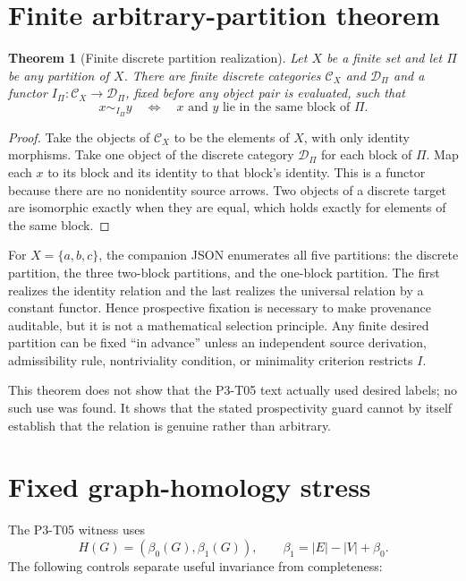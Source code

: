 \documentclass[11pt]{article}
\newtheorem{theorem}{Theorem}
\begin{document}
\section{Finite arbitrary-partition theorem}

\begin{theorem}[Finite discrete partition realization]
Let \(X\) be a finite set and let \(\Pi\) be any partition of \(X\).  There
are finite discrete categories \(\mathcal C_X\) and \(\mathcal D_\Pi\) and a
functor \(I_\Pi:\mathcal C_X\to\mathcal D_\Pi\), fixed before any object
pair is evaluated, such that
\[
 x\sim_{I_\Pi}y \quad\Longleftrightarrow\quad
 x\text{ and }y\text{ lie in the same block of }\Pi.
\]
\end{theorem}
\begin{proof}
Take the objects of \(\mathcal C_X\) to be the elements of \(X\), with only
identity morphisms.  Take one object of the discrete category
\(\mathcal D_\Pi\) for each block of \(\Pi\).  Map each \(x\) to its block
and its identity to that block's identity.  This is a functor because there
are no nonidentity source arrows.  Two objects of a discrete target are
isomorphic exactly when they are equal, which holds exactly for elements of
the same block.
\end{proof}

For \(X=\{a,b,c\}\), the companion JSON enumerates all five partitions:
the discrete partition, the three two-block partitions, and the one-block
partition.  The first realizes the identity relation and the last realizes
the universal relation by a constant functor.  Hence prospective fixation is necessary to make
provenance auditable, but it is not a mathematical selection principle.  Any
finite desired partition can be fixed ``in advance'' unless an independent
source derivation, admissibility rule, nontriviality condition, or minimality
criterion restricts \(I\).

This theorem does not show that the P3-T05 text actually used desired labels;
no such use was found.  It shows that the stated prospectivity guard cannot by
itself establish that the relation is genuine rather than arbitrary.

\section{Fixed graph-homology stress}

The P3-T05 witness uses
\[
 H(G)=(\beta_0(G),\beta_1(G)),\qquad
 \beta_1=|E|-|V|+\beta_0.
\]
The following controls separate useful invariance from completeness:
\end{document}

